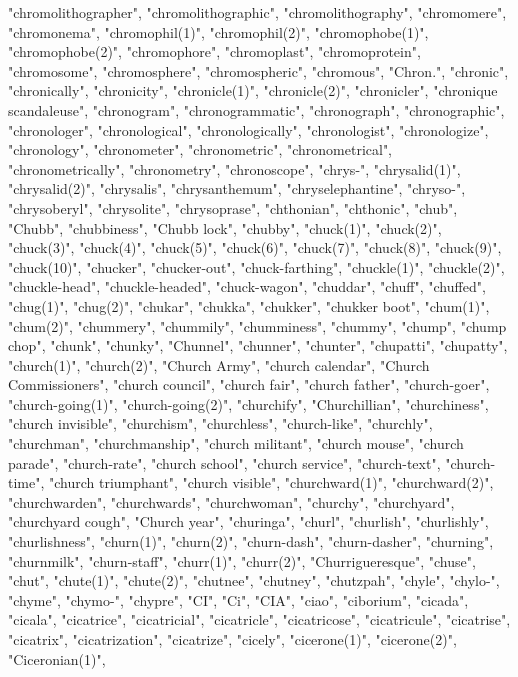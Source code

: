 "chromolithographer",
"chromolithographic",
"chromolithography",
"chromomere",
"chromonema",
"chromophil(1)",
"chromophil(2)",
"chromophobe(1)",
"chromophobe(2)",
"chromophore",
"chromoplast",
"chromoprotein",
"chromosome",
"chromosphere",
"chromospheric",
"chromous",
"Chron.",
"chronic",
"chronically",
"chronicity",
"chronicle(1)",
"chronicle(2)",
"chronicler",
"chronique scandaleuse",
"chronogram",
"chronogrammatic",
"chronograph",
"chronographic",
"chronologer",
"chronological",
"chronologically",
"chronologist",
"chronologize",
"chronology",
"chronometer",
"chronometric",
"chronometrical",
"chronometrically",
"chronometry",
"chronoscope",
"chrys-",
"chrysalid(1)",
"chrysalid(2)",
"chrysalis",
"chrysanthemum",
"chryselephantine",
"chryso-",
"chrysoberyl",
"chrysolite",
"chrysoprase",
"chthonian",
"chthonic",
"chub",
"Chubb",
"chubbiness",
"Chubb lock",
"chubby",
"chuck(1)",
"chuck(2)",
"chuck(3)",
"chuck(4)",
"chuck(5)",
"chuck(6)",
"chuck(7)",
"chuck(8)",
"chuck(9)",
"chuck(10)",
"chucker",
"chucker-out",
"chuck-farthing",
"chuckle(1)",
"chuckle(2)",
"chuckle-head",
"chuckle-headed",
"chuck-wagon",
"chuddar",
"chuff",
"chuffed",
"chug(1)",
"chug(2)",
"chukar",
"chukka",
"chukker",
"chukker boot",
"chum(1)",
"chum(2)",
"chummery",
"chummily",
"chumminess",
"chummy",
"chump",
"chump chop",
"chunk",
"chunky",
"Chunnel",
"chunner",
"chunter",
"chupatti",
"chupatty",
"church(1)",
"church(2)",
"Church Army",
"church calendar",
"Church Commissioners",
"church council",
"church fair",
"church father",
"church-goer",
"church-going(1)",
"church-going(2)",
"churchify",
"Churchillian",
"churchiness",
"church invisible",
"churchism",
"churchless",
"church-like",
"churchly",
"churchman",
"churchmanship",
"church militant",
"church mouse",
"church parade",
"church-rate",
"church school",
"church service",
"church-text",
"church-time",
"church triumphant",
"church visible",
"churchward(1)",
"churchward(2)",
"churchwarden",
"churchwards",
"churchwoman",
"churchy",
"churchyard",
"churchyard cough",
"Church year",
"churinga",
"churl",
"churlish",
"churlishly",
"churlishness",
"churn(1)",
"churn(2)",
"churn-dash",
"churn-dasher",
"churning",
"churnmilk",
"churn-staff",
"churr(1)",
"churr(2)",
"Churrigueresque",
"chuse",
"chut",
"chute(1)",
"chute(2)",
"chutnee",
"chutney",
"chutzpah",
"chyle",
"chylo-",
"chyme",
"chymo-",
"chypre",
"CI",
"Ci",
"CIA",
"ciao",
"ciborium",
"cicada",
"cicala",
"cicatrice",
"cicatricial",
"cicatricle",
"cicatricose",
"cicatricule",
"cicatrise",
"cicatrix",
"cicatrization",
"cicatrize",
"cicely",
"cicerone(1)",
"cicerone(2)",
"Ciceronian(1)",
